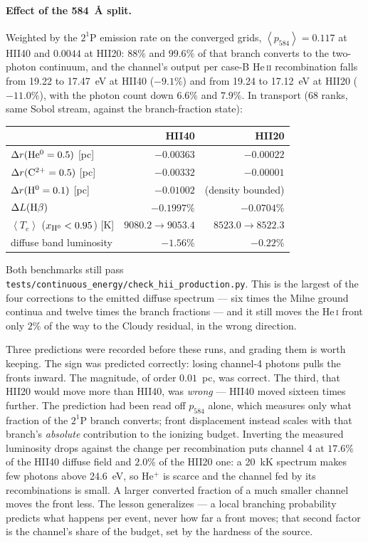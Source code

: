 \documentclass[english,a4paper]{my_memo}
\newcommand{\code}[1]{\texttt{#1}}
\begin{document}
\paragraph{Effect of the 584~\AA{} split.}  Weighted by the $2^1$P emission
rate on the converged grids, $\left<p_{584}\right> = 0.117$ at HII40 and
$0.0044$ at HII20: $88\%$ and $99.6\%$ of that branch converts to the
two-photon continuum, and the channel's output per case-B He\,\textsc{ii}
recombination falls from 19.22 to 17.47~eV at HII40 ($-9.1\%$) and from 19.24
to 17.12~eV at HII20 ($-11.0\%$), with the photon count down $6.6\%$ and
$7.9\%$.  In transport (68 ranks, same Sobol stream, against the branch-fraction
state):
\begin{center}
\begin{tabular}{lrr}
\toprule
 & HII40 & HII20 \\
\midrule
$\Delta r({\rm He^0}=0.5)$ [pc]  & $-0.00363$ & $-0.00022$ \\
$\Delta r({\rm C^{2+}}=0.5)$ [pc] & $-0.00332$ & $-0.00001$ \\
$\Delta r({\rm H^0}=0.1)$ [pc]   & $-0.01002$ & (density bounded) \\
$\Delta L({\rm H}\beta)$          & $-0.1997\%$ & $-0.0704\%$ \\
$\left<T_e\right>$ ($x_{\rm H^0}<0.95$) [K]
  & $9080.2\rightarrow9053.4$ & $8523.0\rightarrow8522.3$ \\
diffuse band luminosity           & $-1.56\%$ & $-0.22\%$ \\
\bottomrule
\end{tabular}
\end{center}
Both benchmarks still pass
\code{tests/continuous\_energy/check\_hii\_production.py}.  This is the
largest of the four corrections to the emitted diffuse spectrum --- six times
the Milne ground continua and twelve times the branch fractions --- and it
still moves the He\,\textsc{i} front only $2\%$ of the way to the Cloudy
residual, in the wrong direction.

Three predictions were recorded before these runs, and grading them is worth
keeping.  The sign was predicted correctly: losing channel-4 photons pulls
the fronts inward.  The magnitude, of order $0.01$~pc, was correct.  The
third, that HII20 would move more than HII40, was \emph{wrong} --- HII40
moved sixteen times further.  The prediction had been read off $p_{584}$
alone, which measures only what fraction of the $2^1$P branch converts;
front displacement instead scales with that branch's \emph{absolute}
contribution to the ionizing budget.  Inverting the measured luminosity drops
against the change per recombination puts channel 4 at $17.6\%$ of the HII40
diffuse field and $2.0\%$ of the HII20 one: a 20~kK spectrum makes few
photons above 24.6~eV, so He$^+$ is scarce and the channel fed by its
recombinations is small.  A larger converted fraction of a much smaller
channel moves the front less.  The lesson generalizes --- a local branching
probability predicts what happens per event, never how far a front moves;
that second factor is the channel's share of the budget, set by the hardness
of the source.
\end{document}
